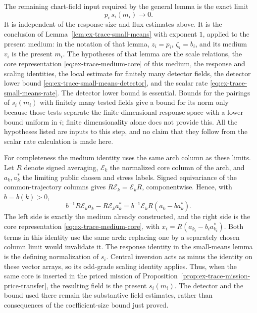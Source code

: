 The remaining chart-field input required by the general lemma is the exact
limit
\begin{equation}
 p_i\,s_i(m_i)\longrightarrow0.
 \label{eq:ex-lattice-trace-chart-field-decay}
\end{equation}
It is independent of the response-size and flux estimates above. It is the
conclusion of Lemma~\ref{lem:ex-trace-small-means} with exponent $1$,
applied to the present medium: in the notation of that lemma,
$z_i=p_i$, $\zeta_i=b_i$, and its medium $v_i$ is the present $m_i$.
The hypotheses of that lemma are the scale relations, the core
representation \eqref{eq:ex-trace-medium-core} of this medium, the
response and scaling identities, the local estimate for finitely many
detector fields, the detector lower bound
\eqref{eq:ex-trace-small-means-detector}, and the scalar rate
\eqref{eq:ex-trace-small-means-rate}. The detector lower bound is
essential. Bounds for the pairings of $s_i(m_i)$ with finitely many tested
fields give a bound for its norm only because those tests separate the
finite-dimensional response space with a lower bound uniform in $i$;
finite dimensionality alone does not provide this. All the hypotheses
listed are inputs to this step, and no claim that they follow from the
scalar rate calculation is made here.

For completeness the medium identity uses the same arch column as these
limits. Let $R$ denote signed averaging, $\mathcal E_k$ the normalized
core column of the arch, and $a_k,a_k^*$ the limiting public chosen and
stress labels. Signed equivariance of the common-trajectory columns gives
$R\mathcal E_k=\mathcal E_kR$, componentwise. Hence, with $b=b(k)>0$,
\[
 b^{-1}R\mathcal E_k a_k-R\mathcal E_k a_k^*
 =b^{-1}\mathcal E_k R(a_k-ba_k^*).
\]
The left side is exactly the medium already constructed, and the right
side is the core representation \eqref{eq:ex-trace-medium-core}, with
$x_i=R(a_{k_i}-b_i a_{k_i}^*)$. Both terms in this identity use the same
arch: replacing one by a separately chosen column limit would invalidate
it. The response identity in the small-means lemma is the defining
normalization of $s_i$. Central inversion acts as minus the identity on
these vector arrays, so its odd-grade scaling identity applies. Thus,
when the same core is inserted in the priced mission of
Proposition~\ref{prop:ex-trace-mission-price-transfer}, the resulting
field is the present $s_i(m_i)$. The detector and the bound used there
remain the substantive field estimates, rather than consequences of the
coefficient-size bound just proved.
